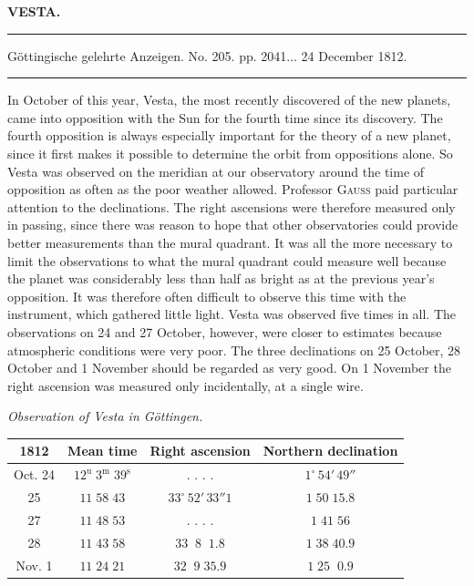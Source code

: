\clearpage{}\hypertarget{native-366-lower}{}\label{native-366-lower}
\begin{center}\textbf{VESTA.}\par\vspace{4pt}\hrule\vspace{4pt}\fontsize{10}{12}\selectfont Göttingische gelehrte Anzeigen. No. 205. pp. 2041\;... 24 December 1812.\par\vspace{4pt}\hrule\vspace{4pt}\end{center}

\par\indent In October of this year, Vesta, the most recently discovered of the new planets, came into opposition with the Sun for the fourth time since its discovery. The fourth opposition is always especially important for the theory of a new planet, since it first makes it possible to determine the orbit from oppositions alone. So Vesta was observed on the meridian at our observatory around the time of opposition as often as the poor weather allowed. Professor \textsc{Gauss} paid particular attention to the declinations. The right ascensions were therefore measured only in passing, since there was reason to hope that other observatories could provide better measurements than the mural quadrant. It was all the more necessary to limit the observations to what the mural quadrant could measure well because the planet was considerably less than half as bright as at the previous year’s opposition. It was therefore often difficult to observe this time with the instrument, which gathered little light. Vesta was observed five times in all. The observations on 24 and 27 October, however, were closer to estimates because atmospheric conditions were very poor. The three declinations on 25 October, 28 October and 1 November should be regarded as very good. On 1 November the right ascension was measured only incidentally, at a single wire.

\medskip
{}\noindent\emph{Observation of Vesta in Göttingen.}

\begin{center}
\fontsize{10}{12}\selectfont\setlength{\tabcolsep}{4pt}\renewcommand{\arraystretch}{1.15}\begin{tabular}{|c|c|c|c|}
\hline
1812 & Mean time & Right ascension & Northern declination \\
\hline
Oct. 24 & $12^{\mathrm u}\;3^{\mathrm m}\;39^{\mathrm s}$ & . . . . & $1^\circ\,54'\,49''$ \\
25 & $11\;58\;43$ & $33^\circ\,52'\,33''1$ & $1\;50\;15.8$ \\
27 & $11\;48\;53$ & . . . . & $1\;41\;56$ \\
28 & $11\;43\;58$ & $33\;\;8\;\;1.8$ & $1\;38\;40.9$ \\
Nov. 1 & $11\;24\;21$ & $32\;\;9\;35.9$ & $1\;25\;\;0.9$ \\
\hline
\end{tabular}
\end{center}

